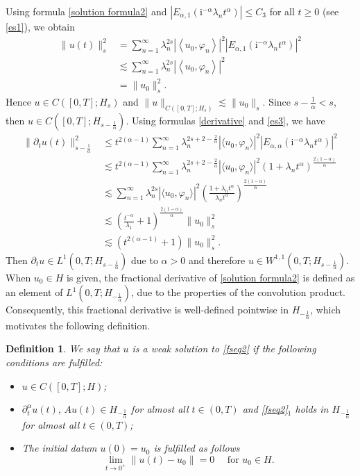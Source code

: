 \documentclass[reqno]{amsart}
\makeatletter
\renewenvironment{proof}[1][\proofname]{\par
  \pushQED{\qed}%
  \normalfont \topsep6\p@\@plus6\p@\relax
  \trivlist
  \item[\hskip\labelsep\bfseries #1\@addpunct{.}]%
}{%
  \popQED\endtrivlist\@endpefalse
}
\newtheorem{defn}[theorem]{Definition}
\numberwithin{equation}{section}
\makeatother
\begin{document}
\begin{proof}
	Using formula \eqref{solution formula2} and $|E_{\alpha, 1}\left(\mathrm{i}^{-\alpha}\lambda_n t^\alpha\right)|\leq C_3$ for all $t\ge 0$ (see \eqref{es1}), we obtain
	\begin{align}
		\|u(t)\|^2_s&=\sum_{n=1}^{\infty}\lambda_{n}^{2s}|\left\langle u_0, \varphi_n\right\rangle|^2 |E_{\alpha, 1}\left(\mathrm{i}^{-\alpha}\lambda_n t^\alpha\right)|^2 \nonumber\\
		&\lesssim\sum_{n=1}^{\infty}\lambda_{n}^{2s}|\left\langle u_0, \varphi_n\right\rangle|^2 \nonumber\\
		&=\|u_0\|^{2}_s.\nonumber
	\end{align}
	Hence $u\in C([0,T];H_s)$ and $\|u\|_{C([0,T];H_s)}\lesssim \|u_0\|_s$. Since $s-\frac{1}{\alpha}<s$, then $u\in C\left([0,T]; H_{s-\frac{1}{\alpha}}\right)$. Using formulas \eqref{derivative} and \eqref{es3}, we have
	\begin{align}
		\|\partial_t u(t)\|^2_{s-\frac{1}{\alpha}}&\leq t^{2(\alpha-1)}\sum_{n=1}^{\infty}\lambda_{n}^{2s+2-\frac{2}{\alpha}}|\langle u_0,\varphi_{n}\rangle|^2|E_{\alpha, \alpha}\left(\mathrm{i}^{-\alpha}\lambda_n t^\alpha\right)|^2  \nonumber\\
		&\lesssim  t^{2(\alpha-1)}\sum_{n=1}^{\infty}\lambda_{n}^{2s+2-\frac{2}{\alpha}}|\langle u_0,\varphi_{n}\rangle|^2\left(1+\lambda_n t^\alpha\right)^{\frac{2(1-\alpha)}{\alpha}}  \nonumber\\
		&\lesssim  \sum_{n=1}^{\infty}\lambda_{n}^{2s}|\langle u_0,\varphi_{n}\rangle|^2\left(\frac{1+\lambda_n t^\alpha}{\lambda_n t^\alpha}\right)^{\frac{2(1-\alpha)}{\alpha}}  \nonumber\\
		&\lesssim  \left(\frac{t^{-\alpha}}{\lambda_1}+1\right)^{\frac{2(1-\alpha)}{\alpha}}\|u_0\|^2_s \nonumber\\
        &\lesssim  \left(t^{2(\alpha-1)}+1\right)\|u_0\|^2_s. \nonumber
	\end{align}
	Then $\partial_t u\in L^{1}\left(0,T; H_{s-\frac{1}{\alpha}}\right)$ due to $\alpha>0$ and therefore $u\in W^{1,1}\left(0,T; H_{s-\frac{1}{\alpha}}\right)$.
\end{proof}
When $u_0 \in H$ is given, the fractional derivative of \eqref{solution formula2} is defined as an element of $L^1\left(0, T; H_{-\frac{1}{\alpha}}\right)$, due to the properties of the convolution product. Consequently, this fractional derivative is well-defined pointwise in $H_{-\frac{1}{\alpha}}$, which motivates the following definition.
\begin{defn} \label{solution_def2}
	We say that $u$ is a weak solution to \eqref{fseq2} if the following conditions are fulfilled:
	\begin{itemize}
		\item[(i)] $u\in C([0,T];H)$;
		\item[(ii)] $\partial_t^\alpha u(t),\, Au(t)\in H_{-\frac{1}{\alpha}}$ for almost all $t\in (0,T)$ and \eqref{fseq2}$_{1}$ holds in $H_{-\frac{1}{\alpha}}$ for almost all $t\in (0,T)$;
		\item[(iii)] The initial datum $u(0)=u_0$ is fulfilled as follows
		$$\lim_{t\to 0^{+}}\|u(t)-u_0\|=0 \quad \text{ for }u_0\in H.$$
	\end{itemize}
\end{defn} 
\end{document}
